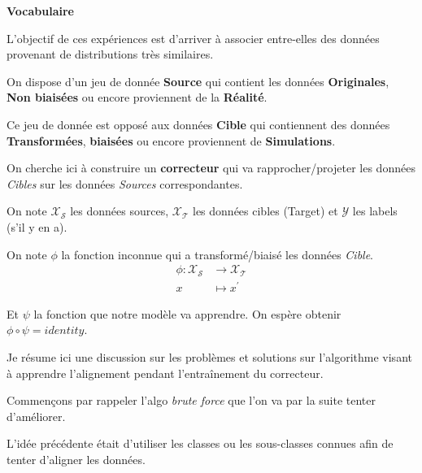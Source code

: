 
\label{day:11-04-2016}

{\Large \textbf{Vocabulaire}}

L'objectif de ces expériences est d'arriver à associer entre-elles des données
provenant de distributions très similaires.

On dispose d'un jeu de donnée \textbf{Source} qui contient les données 
\textbf{Originales}, \textbf{Non biaisées} ou encore proviennent de
la \textbf{Réalité}.

Ce jeu de donnée est opposé aux données \textbf{Cible} qui contiennent des
données \textbf{Transformées}, \textbf{biaisées} ou encore proviennent de
\textbf{Simulations}.

On cherche ici à construire un \textbf{correcteur} qui va rapprocher/projeter
les données \emph{Cibles} sur les données \emph{Sources} correspondantes.

On note $\mathcal{X_S}$ les données sources, $\mathcal{X_T}$ les données 
cibles (Target) et $\mathcal{Y}$ les labels (s'il y en a).

On note $\phi$ la fonction inconnue qui a transformé/biaisé les données \emph{Cible}.
\begin{align*}
\phi : \mathcal{X_S}  &\to \mathcal{X_T} \\
                  x &\mapsto x^\prime
\end{align*}

Et $\psi$ la fonction que notre modèle va apprendre. On espère obtenir
$\phi \circ \psi = identity$.




Je résume ici une discussion sur les problèmes et solutions sur l'algorithme
visant à apprendre l'alignement pendant l'entraînement du correcteur.


Commençons par rappeler l'algo \emph{brute force} que l'on va par la suite
tenter d'améliorer.

L'idée précédente était d'utiliser les classes ou les sous-classes connues
afin de tenter d'aligner les données. 

